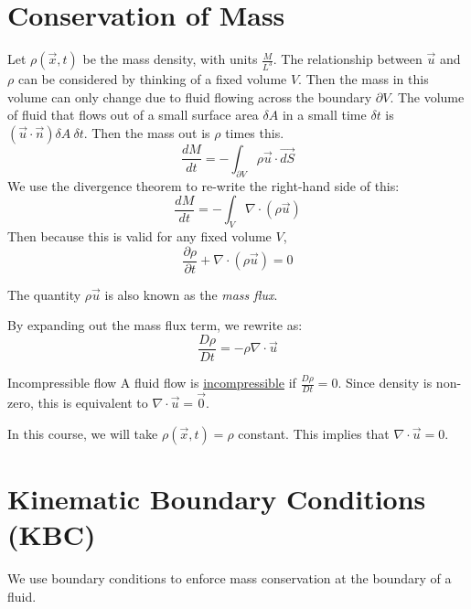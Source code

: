 \documentclass[../Main.tex]{subfiles}
\begin{document}
\section{Conservation of Mass}
Let $\rho(\vec{x}, t)$ be the mass density, with units $\frac{M}{L^3}$. The relationship between $\vec{u}$ and $\rho$ can be considered by thinking of a fixed volume $V$. Then the mass in this volume can only change due to fluid flowing across the boundary $\partial V$. The volume of fluid that flows out of a small surface area $\delta A$ in a small time $\delta t$ is $(\vec{u} \cdot \vec{n}) \delta A~\delta t$. Then the mass out is $\rho$ times this.
\begin{equation*}
    \frac{dM}{dt} = -\int_{\partial V} \rho \vec{u} \cdot \vec{dS}
\end{equation*}
We use the divergence theorem to re-write the right-hand side of this:
\begin{equation*}
    \frac{dM}{dt} = -\int_{V} \nabla \cdot (\rho \vec{u})
\end{equation*}
Then because this is valid for any fixed volume $V$,
\begin{equation}
    \frac{\partial \rho}{\partial t} + \nabla \cdot (\rho \vec{u}) = 0
    \label{eqnMassConserve}
\end{equation}
\begin{remark}
    The quantity $\rho \vec{u}$ is also known as the \textit{mass flux}.
\end{remark}
By expanding out the mass flux term, we rewrite as:
\begin{equation*}
    \frac{D \rho}{D t} = -\rho \nabla \cdot \vec{u}
\end{equation*}
\begin{definition}{Incompressible flow}
    A fluid flow is \underline{incompressible} if $\frac{D \rho}{D t} = 0$. Since density is non-zero, this is equivalent to $\nabla \cdot \vec{u} = \vec{0}$.
\end{definition}
In this course, we will take $\rho(\vec{x}, t) = \rho$ constant. This implies that $\nabla \cdot \vec{u} = 0$.
\section{Kinematic Boundary Conditions (KBC)}
\label{secKBC}
We use boundary conditions to enforce mass conservation at the boundary of a fluid.
\end{document}
